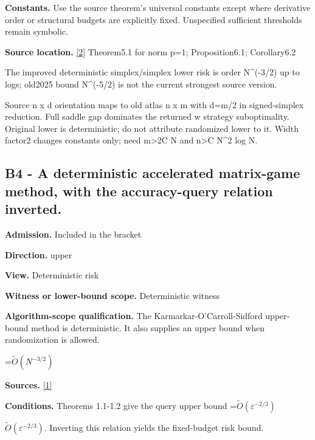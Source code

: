 \documentclass[10pt,a4paper]{article}
\newcommand{\AtlasMath}[1]{\par\begingroup\centering\setbox0=\hbox{$\displaystyle #1$}\ifdim\wd0>1.4\linewidth\typeout{ATLAS WIDE FORMULA: \the\wd0}\fi\ifdim\wd0>\linewidth\resizebox{\linewidth}{!}{\box0}\else\box0\fi\par\endgroup}
\newcommand{\AtlasInlineMath}[1]{\begingroup\setbox0=\hbox{$#1$}\ifdim\wd0>.4\linewidth\endgroup\AtlasMath{#1}\else\endgroup$#1$\fi}
\begin{document}
\textbf{Constants.} Use the source theorem’s universal constants except where derivative order or structural budgets are explicitly fixed. Unspecified sufficient thresholds remain symbolic.



\textbf{Source location.} \href{https://arxiv.org/pdf/2412.06990v4}{[2]} Theorem5.1 for norm p=1; Proposition6.1; Corollary6.2



The improved deterministic simplex/simplex lower risk is order N\textasciicircum{}(-3/2) up to logs; old2025 bound N\textasciicircum{}(-5/2) is not the current strongest source version.



Source n x d orientation maps to old atlas n x m with d=m/2 in signed-simplex reduction. Full saddle gap dominates the returned w strategy suboptimality. Original lower is deterministic; do not attribute randomized lower to it. Width factor2 changes constants only; need m>2C N and n>C N\textasciicircum{}2 log N.



\subsection{B4 - A deterministic accelerated matrix-game method, with the accuracy-query relation inverted.}


\textbf{Admission.} Included in the bracket



\textbf{Direction.} upper



\textbf{View.} Deterministic risk



\textbf{Witness or lower-bound scope.} Deterministic witness



\textbf{Algorithm-scope qualification.} The Karmarkar-O’Carroll-Sidford upper-bound method is deterministic. It also supplies an upper bound when randomization is allowed.



\AtlasMath{\widetilde{O}(N^{-3/2})}


\textbf{Sources.} \href{https://arxiv.org/pdf/2601.02347v3}{[1]}



\textbf{Conditions.} Theorems 1.1-1.2 give the query upper bound \AtlasInlineMath{\widetilde O(\varepsilon^{-2/3})}. Inverting this relation yields the fixed-budget risk bound.
\end{document}
